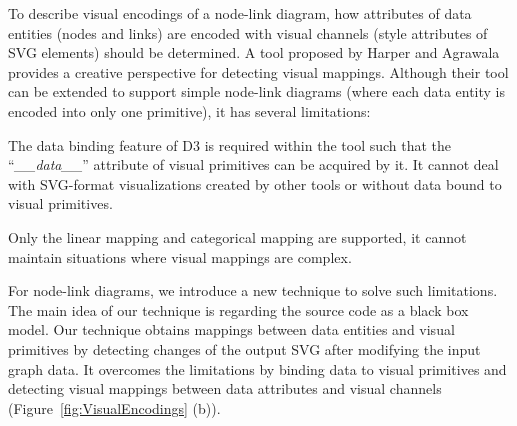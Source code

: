 To describe visual encodings of a node-link diagram, how attributes of data entities (nodes and links) are encoded with visual channels (style attributes of SVG elements) should be determined.
A tool proposed by Harper and Agrawala~\cite{DBLP:conf/uist/HarperA14} provides a creative perspective for detecting visual mappings.
Although their tool can be extended to support simple node-link diagrams (where each data entity is encoded into only one primitive), it has several limitations:
\begin{compactenum}

\item The data binding feature of D3 is required within the tool such that the ``\textit{\_\_data\_\_}'' attribute of visual primitives can be acquired by it. 
It cannot deal with SVG-format visualizations created by other tools or without data bound to visual primitives.

\item Only the linear mapping and categorical mapping are supported, it cannot maintain situations where visual mappings are complex.

\end{compactenum}

For node-link diagrams, we introduce a new technique to solve such limitations.
The main idea of our technique is regarding the source code as a black box model.
Our technique obtains mappings between data entities and visual primitives by detecting changes of the output SVG after modifying the input graph data.
It overcomes the limitations by binding data to visual primitives and detecting visual mappings between data attributes and visual channels (Figure~\ref{fig:VisualEncodings} (b)).



